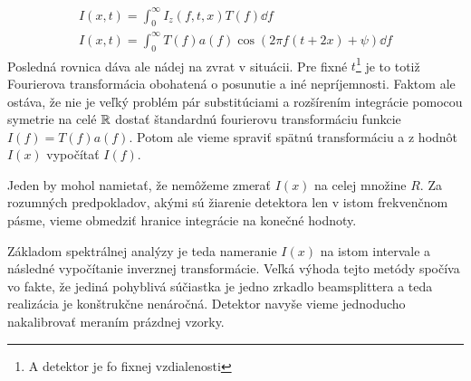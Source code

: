 \begin{align}
    I(x,t)=\int_0^\infty I_z(f,t,x) T(f) \dd f \\
    I(x,t)=\int_0^\infty T(f) a(f) \cos(2 \pi f (t + 2x) + \psi) \dd f
\end{align}
Posledná rovnica dáva ale nádej na zvrat v situácii. Pre fixné
$t$\footnote{A detektor je fo fixnej vzdialenosti} 
je to totiž Fourierova transformácia obohatená o posunutie a iné
nepríjemnosti. Faktom ale ostáva, že nie je veľký problém pár
substitúciami a rozšírením integrácie pomocou symetrie na celé ${\mathbb R}$
dostať štandardnú fourierovu transformáciu funkcie $I(f) = T(f) a(f)$.
Potom ale vieme spraviť spätnú transformáciu a z hodnôt $I(x)$
vypočítať $I(f)$.
\begin{poznamka}
    Jeden by mohol namietať, že nemôžeme zmerať
    $I(x)$ na celej množine $R$. Za rozumných predpokladov, akými sú
    žiarenie detektora len v istom frekvenčnom pásme,
    vieme obmedziť hranice integrácie na konečné hodnoty.
\end{poznamka}

Základom spektrálnej analýzy je teda nameranie $I(x)$ na istom
intervale a následné vypočítanie inverznej transformácie. Veľká výhoda
tejto metódy spočíva vo fakte, že jediná pohyblivá súčiastka je jedno
zrkadlo beamsplittera a teda realizácia je konštrukčne nenáročná.
Detektor navyše vieme jednoducho nakalibrovať meraním prázdnej vzorky.
